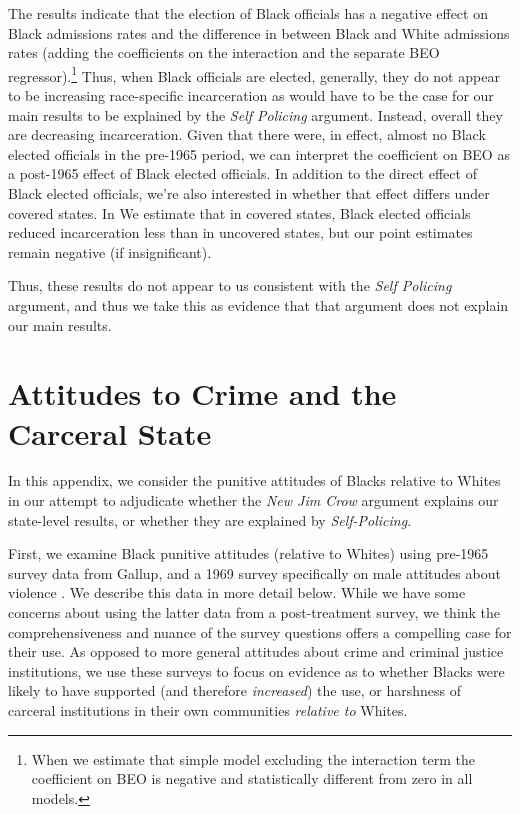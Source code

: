 \documentclass[12pt]{article}
\begin{document}
The results indicate that the election of Black officials has a negative effect on Black admissions rates and the difference in between Black and White admissions rates (adding the coefficients on the interaction and the separate BEO regressor).\footnote{When we estimate that simple model excluding the interaction term the coefficient on BEO is negative and statistically different from zero in all models. }  Thus, when Black officials are elected, generally, they do not appear to be increasing race-specific incarceration as would have to be the case for our main results to be explained by the \emph{Self Policing} argument.  Instead, overall they are decreasing incarceration.  Given that there were, in effect, almost no Black elected officials in the pre-1965 period, we can interpret the coefficient on BEO as a post-1965 effect of Black elected officials. In addition to the direct effect of Black elected officials, we're also interested in whether that effect differs under covered states.  In We estimate that in covered states, Black elected officials reduced incarceration less than in uncovered states, but our point estimates remain negative (if insignificant).

Thus, these results do not appear to us consistent with the \emph{Self Policing} argument, and thus we take this as evidence that that argument does not explain our main results.







\section{Attitudes to Crime and the Carceral State}\label{appendix_attitudes}
\setcounter{table}{0}
\setcounter{figure}{0}
\renewcommand{\thetable}{I\arabic{table}}
\renewcommand{\thefigure}{I\arabic{figure}}
\normalsize

In this appendix, we consider the punitive attitudes of Blacks relative to Whites in our attempt to adjudicate whether the \emph{New Jim Crow} argument explains our state-level results, or whether they are explained by \emph{Self-Policing}.

First, we examine Black punitive attitudes (relative to Whites) using pre-1965 survey data from Gallup, and a 1969 survey specifically on male attitudes about violence .  We describe this data in more detail below.  While we have some concerns about using the latter data from a post-treatment survey, we think the comprehensiveness and nuance of the survey questions offers a compelling case for their use.  As opposed to more general attitudes about crime and criminal justice institutions, we use these surveys to focus on evidence as to whether Blacks were likely to have supported (and therefore \emph{increased}) the use, or harshness of carceral institutions in their own communities \emph{relative to} Whites.
\end{document}
